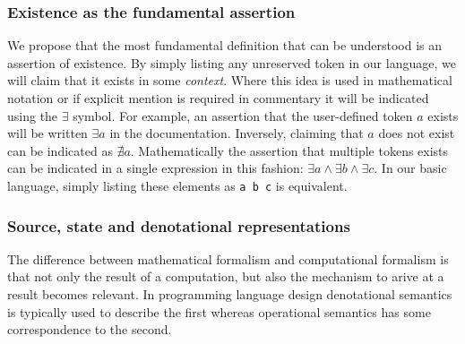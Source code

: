 \documentclass[11pt]{article}
\begin{document}
\subsubsection{Existence as the fundamental assertion}
We propose that the most fundamental definition that can be understood is an assertion of existence. 
By simply listing any unreserved token in our language, we will claim that it exists in some \emph{context}.
Where this idea is used in mathematical notation or if explicit mention is required in commentary it will be indicated using the $\exists$ symbol.
For example, an assertion that the user-defined token $a$ exists will be written $\exists a$ in the documentation.
Inversely, claiming that $a$ does not exist can be indicated as $\nexists a$.
Mathematically the assertion that multiple tokens exists can be indicated in a single expression in this fashion: $\exists a \land \exists b \land \exists c$.
In our basic language, simply listing these elements as \texttt{a b c} is equivalent.



\subsubsection{Source, state and denotational representations}
The difference between mathematical formalism and computational formalism is that not only the result of a computation, but also the mechanism to arive at a result becomes relevant.
In programming language design denotational semantics is typically used to describe the first whereas operational semantics has some correspondence to the second.
\end{document}
